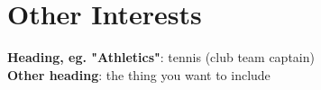 \documentclass[letterpaper,12pt]{article}
\begin{document}
\section{Other Interests}
\begin{itemize}[leftmargin=0.15in, label={}]
    \normalsize{\item{
     \textbf{Heading, eg. "Athletics"}{: {tennis (club team captain)} } \\
      \textbf{Other heading}{: {the thing you want to include} } \\
    }}    
 \end{itemize}
\end{document}
